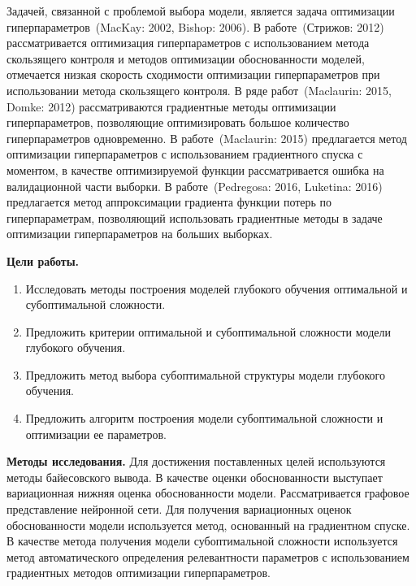 \documentclass[11pt, a5paper]{dissert}
\theoremstyle{definition}
\begin{document}
Задачей, связанной с проблемой выбора модели, является задача оптимизации гиперпараметров~(MacKay: 2002, Bishop: 2006). В работе~(Стрижов: 2012) рассматривается оптимизация гиперпараметров с использованием метода скользящего контроля и методов оптимизации обоснованности моделей, отмечается низкая скорость сходимости оптимизации гиперпараметров при использовании метода скользящего контроля. В ряде работ~(Maclaurin: 2015, Domke: 2012) рассматриваются градиентные методы оптимизации гиперпараметров, позволяющие оптимизировать большое количество гиперпараметров одновременно. В работе~(Maclaurin: 2015) предлагается метод оптимизации гиперпараметров с использованием градиентного спуска с моментом, в качестве оптимизируемой функции рассматривается ошибка на валидационной части выборки. В работе~(Pedregosa: 2016, Luketina: 2016) предлагается метод аппроксимации градиента функции потерь по гиперпараметрам, позволяющий использовать градиентные методы в задаче оптимизации гиперпараметров на больших выборках. %

\vspace{0.5cm}
\textbf{Цели работы.}
\vspace{0.2cm}
\begin{enumerate}
\item Исследовать методы построения моделей глубокого обучения оптимальной и субоптимальной сложности.
\item Предложить критерии оптимальной и субоптимальной сложности модели глубокого обучения.
\item Предложить метод выбора субоптимальной структуры модели глубокого обучения.
\item Предложить алгоритм построения модели субоптимальной сложности и оптимизации ее параметров.
\end{enumerate}


\vspace{0.5cm}
\textbf{Методы исследования.} Для достижения поставленных целей используются методы байесовского вывода. В качестве оценки обоснованности выступает вариационная нижняя оценка обоснованности модели. Рассматривается графовое представление нейронной сети. Для получения вариационных оценок обоснованности модели используется метод, основанный на градиентном спуске. В качестве метода получения модели субоптимальной сложности используется метод автоматического определения релевантности параметров с использованием градиентных методов оптимизации гиперпараметров.
\end{document}

